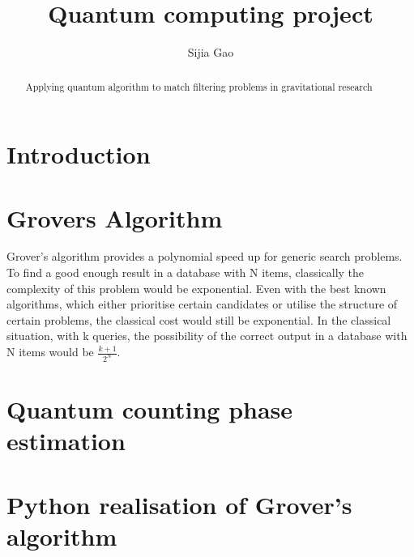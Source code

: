 \documentclass[a4paper]{jpconf}
\begin{document}
\title{Quantum computing project}

\author{Sijia Gao}

\begin{abstract}
Applying quantum algorithm to match filtering problems in gravitational research
\end{abstract}

\section{Introduction}
\section{Grovers Algorithm}
Grover's algorithm provides a polynomial speed up for generic search problems. To find a good enough result in a database with N items, classically the complexity of this problem would be exponential. Even with the best known algorithms, which either prioritise certain candidates or utilise the structure of certain problems, the classical cost would still be exponential. 
\newline \newline In the classical situation, with k queries, the possibility of the correct output in a database with N items would be $\frac{k+1}{2^N}$.
\section{Quantum counting phase estimation }
\section{Python realisation of Grover's algorithm}
\end{document}
